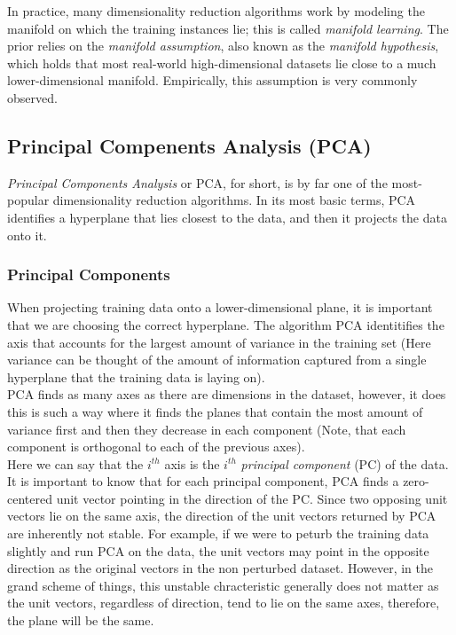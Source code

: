 \noindent 
In practice, many dimensionality reduction algorithms work by modeling the manifold on which the training
instances lie; this is called \textit{manifold learning}. The prior relies on the \textit{manifold assumption},
also known as the \textit{manifold hypothesis}, which holds that most real-world high-dimensional datasets lie
close to a much lower-dimensional manifold. Empirically, this assumption is very commonly observed.

\subsection{Principal Compenents Analysis (PCA)}

\textit{Principal Components Analysis} or PCA, for short, is by far one of the most-popular dimensionality
reduction algorithms. In its most basic terms, PCA identifies a hyperplane that lies closest to the data,
and then it projects the data onto it.

\subsubsection*{Principal Components}

When projecting training data onto a lower-dimensional plane, it is important that we are choosing the correct
hyperplane. The algorithm PCA identitifies the axis that accounts for the largest amount of variance in the 
training set (Here variance can be thought of the amount of information captured from a single hyperplane
that the training data is laying on). \\

\noindent
PCA finds as many axes as there are dimensions in the dataset, however, it does this is such a way where it finds
the planes that contain the most amount of variance first and then they decrease in each component (Note, that 
each component is orthogonal to each of the previous axes). \\ 

\noindent
Here we can say that the $i^{th}$ axis is the $i^{th}$ \textit{principal component} (PC) of the data. It is important
to know that for each principal component, PCA finds a zero-centered unit vector pointing in the direction of the PC.
Since two opposing unit vectors lie on the same axis, the direction of the unit vectors returned by PCA are inherently
not stable. For example, if we were to peturb the training data slightly and run PCA on the data, the unit vectors 
may point in the opposite direction as the original vectors in the non perturbed dataset. However, in the grand 
scheme of things, this unstable chracteristic generally does not matter as the unit vectors, regardless of direction, 
tend to lie on the same axes, therefore, the plane will be the same. \\

